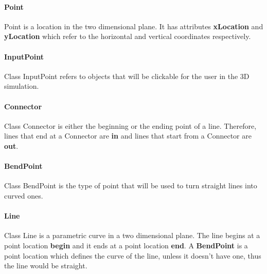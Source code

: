 \paragraph{Point}
Point is a location in the two dimensional plane. It has attributes \textbf{xLocation} and \textbf{yLocation} which refer to the horizontal and vertical coordinates respectively.

\paragraph{InputPoint}
Class InputPoint refers to objects that will be clickable for the user in the 3D simulation. 

\paragraph{Connector}
Class Connector is either the beginning or the ending point of a line. Therefore, lines that end at a Connector are \textbf{in} and lines that start from a Connector are \textbf{out}.

\paragraph{BendPoint}
Class BendPoint is the type of point that will be used to turn straight lines into curved ones.

\paragraph{Line}
Class Line is a parametric curve in a two dimensional plane. The line begins at a point location \textbf{begin} and it ends at a point location \textbf{end}. A \textbf{BendPoint} is a point location which defines the curve of the line, unless it doesn't have one, thus the line would be straight.
